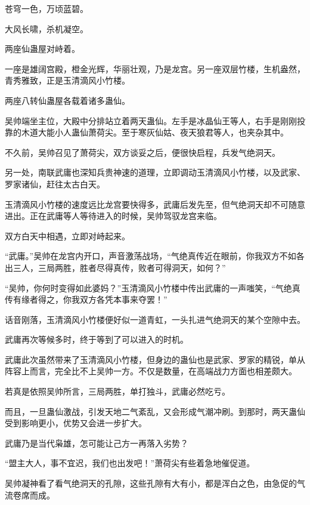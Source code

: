 
\begin{this_body}



苍穹一色，万顷蓝碧。

大风长啸，杀机凝空。

两座仙蛊屋对峙着。

一座是雄阔宫殿，橙金光辉，华丽壮观，乃是龙宫。另一座双层竹楼，生机盎然，青秀雅致，正是玉清滴风小竹楼。

两座八转仙蛊屋各载着诸多蛊仙。

吴帅端坐主位，大殿中分排站立着两天蛊仙。左手是冰晶仙王等人，右手是刚刚投靠的木道大能小人蛊仙萧荷尖。至于寒灰仙姑、夜天狼君等人，也夹杂其中。

不久前，吴帅召见了萧荷尖，双方谈妥之后，便很快启程，兵发气绝洞天。

另一处，南联武庸也深知兵贵神速的道理，立即调动玉清滴风小竹楼，以及武家、罗家诸仙，赶往太古白天。

玉清滴风小竹楼的速度远比龙宫要快得多，武庸后发先至，但气绝洞天却不可随意进出。正在武庸等人等待进入的时候，吴帅驾驭龙宫来临。

双方白天中相遇，立即对峙起来。

“武庸。”吴帅在龙宫内开口，声音激荡战场，“气绝真传近在眼前，你我双方不如各出三人，三局两胜，胜者尽得真传，败者可得洞天，如何？”

“吴帅，你何时变得如此婆妈？”玉清滴风小竹楼中传出武庸的一声嗤笑，“气绝真传有缘者得之，你我双方各凭本事来夺罢！”

话音刚落，玉清滴风小竹楼便好似一道青虹，一头扎进气绝洞天的某个空隙中去。

武庸再次等候多时，终于等到了可以进入的时机。

武庸此次虽然带来了玉清滴风小竹楼，但身边的蛊仙也是武家、罗家的精锐，单从阵容上而言，完全比不上吴帅一方。不仅是数量，在高端战力方面也相差颇大。

若真是依照吴帅所言，三局两胜，单打独斗，武庸必然吃亏。

而且，一旦蛊仙激战，引发天地二气紊乱，又会形成气潮冲刷。到那时，两天蛊仙受到影响更小，优势又会进一步扩大。

武庸乃是当代枭雄，怎可能让己方一再落入劣势？

“盟主大人，事不宜迟，我们也出发吧！”萧荷尖有些着急地催促道。

吴帅凝神看了看气绝洞天的孔隙，这些孔隙有大有小，都是浑白之色，由急促的气流卷席而成。


\end{this_body}

